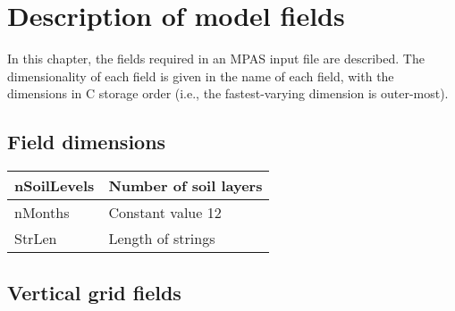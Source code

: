
\chapter{Description of model fields}

In this chapter, the fields required in an MPAS input file are described. The dimensionality of each field is given in the name
of each field, with the dimensions in C storage order (i.e., the fastest-varying dimension is outer-most).

\section{Field dimensions}

{\small
\begin{longtable}{|p{1.75in} |p{4.5in}|}
 \hline
        nSoilLevels      &   Number of soil layers \\ \hline
        nMonths         &   Constant value 12 \\ \hline
        StrLen          &   Length of strings \\ \hline
\end{longtable}
}

\section{Vertical grid fields}

